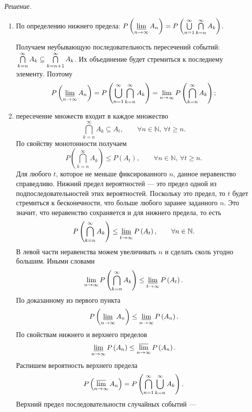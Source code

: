 \textit{Решение.}
\begin{enumerate}[label=\alph*)]
\item По определению нижнего предела: 
$P \left( \varliminf \limits_{n \rightarrow \infty } A_n \right) =
P \left( \bigcup \limits_{n=1}^{ \infty } \bigcap \limits_{k=n}^{ \infty } A_k \right) $.

Получаем неубывающую последовательность пересечений событий:
$ \\
\bigcap \limits_{k=n}^{ \infty } A_k \subseteq \bigcap \limits_{k=n+1}^{ \infty } A_k$.
Их объединение будет стремиться к последнему элементу.
Поэтому
$$P \left( \varliminf \limits_{n \rightarrow \infty } A_n \right) =
P \left( \bigcup \limits_{n=1}^{ \infty } \bigcap \limits_{k=n}^{ \infty } A_k \right) =
\lim \limits_{n \rightarrow \infty } P \left( \bigcap \limits_{k=n}^{ \infty } A_k \right);$$
\item пересечение множеств входит в каждое множество
$$ \bigcap \limits_{k=n}^{ \infty } A_k \subseteq
A_t, \qquad
\forall n \in \mathbb{N}, \,
\forall t \geq n.$$
По свойству монотонности получаем
$$P \left( \bigcap \limits_{k=n}^{ \infty } A_k \right) \leq
P \left( A_t \right), \qquad
\forall n \in \mathbb{N}, \,
\forall t \geq n.$$
Для любого $t$, которое не меньше фиксированного $n$, данное неравенство справедливо.
Нижний предел вероятностей --- это предел одной из подпоследовательностей этих вероятностей.
Поскольку это предел, то $t$ будет стремиться к бесконечности, что больше любого заранее заданного $n$.
Это значит, что неравенство сохраняется и для нижнего предела, то есть
$$P \left( \bigcap \limits_{k=n}^{ \infty } A_k \right) \leq
\varliminf \limits_{t \rightarrow \infty } P \left( A_t \right), \qquad
\forall n \in \mathbb{N}.$$
В левой части неравенства можем увеличивать $n$ и сделать сколь угодно большим.
Иными словами
$$ \lim \limits_{n \rightarrow \infty } P \left( \bigcap \limits_{k=n}^{ \infty } A_k \right) \leq
\varliminf \limits_{t \rightarrow \infty } P \left( A_t \right).$$
По доказанному из первого пункта
$$P \left( \varliminf \limits_{n \rightarrow \infty } A_n \right) \leq
\varliminf \limits_{n \rightarrow \infty } P \left( A_n \right).$$
По свойствам нижнего и верхнего пределов
$$\varliminf \limits_{n \rightarrow \infty } P \left( A_n \right) \leq
\varlimsup \limits_{n \rightarrow \infty } P \left( A_n \right).$$
Распишем вероятность верхнего предела
$$P \left( \varlimsup \limits_{n \rightarrow \infty } A_n \right) =
P \left( \bigcap \limits_{n=1}^{ \infty } \bigcup \limits_{k=n}^{ \infty } A_k \right).$$
Верхний предел последовательности случайных событий ---

\end{enumerate}
